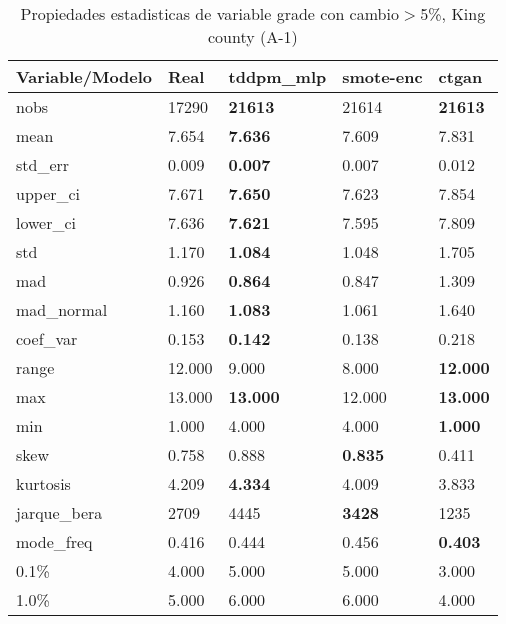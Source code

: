 \begin{table}[H]
\centering
\fontsize{8}{14}\selectfont
\caption{Propiedades estadisticas de variable grade con cambio\ensuremath{>}5\%, King county (A-1)}
\label{table-stats-king county-a-1-grade-short}
\begin{tabular}{|l|m{10em}|m{10em}|m{10em}|m{10em}|}
\hline
 \rowcolor[gray]{0.8}
Variable/Modelo & Real & tddpm\_mlp & smote-enc & ctgan \\
\hline nobs & 17290 & \bfseries 21613 & \cellcolor[rgb]{0.9, 0.54, 0.52} 21614 & \bfseries 21613 \\
\hline mean & 7.654 & \bfseries 7.636 & 7.609 & \cellcolor[rgb]{0.9, 0.54, 0.52} 7.831 \\
\hline std\_err & 0.009 & \bfseries 0.007 & 0.007 & \cellcolor[rgb]{0.9, 0.54, 0.52} 0.012 \\
\hline upper\_ci & 7.671 & \bfseries 7.650 & 7.623 & \cellcolor[rgb]{0.9, 0.54, 0.52} 7.854 \\
\hline lower\_ci & 7.636 & \bfseries 7.621 & 7.595 & \cellcolor[rgb]{0.9, 0.54, 0.52} 7.809 \\
\hline std & 1.170 & \bfseries 1.084 & 1.048 & \cellcolor[rgb]{0.9, 0.54, 0.52} 1.705 \\
\hline mad & 0.926 & \bfseries 0.864 & 0.847 & \cellcolor[rgb]{0.9, 0.54, 0.52} 1.309 \\
\hline mad\_normal & 1.160 & \bfseries 1.083 & 1.061 & \cellcolor[rgb]{0.9, 0.54, 0.52} 1.640 \\
\hline coef\_var & 0.153 & \bfseries 0.142 & 0.138 & \cellcolor[rgb]{0.9, 0.54, 0.52} 0.218 \\
\hline range & 12.000 & 9.000 & \cellcolor[rgb]{0.9, 0.54, 0.52} 8.000 & \bfseries 12.000 \\
\hline max & 13.000 & \bfseries 13.000 & \cellcolor[rgb]{0.9, 0.54, 0.52} 12.000 & \bfseries 13.000 \\
\hline min & 1.000 & \cellcolor[rgb]{0.9, 0.54, 0.52} 4.000 & \cellcolor[rgb]{0.9, 0.54, 0.52} 4.000 & \bfseries 1.000 \\
\hline skew & 0.758 & 0.888 & \bfseries 0.835 & \cellcolor[rgb]{0.9, 0.54, 0.52} 0.411 \\
\hline kurtosis & 4.209 & \bfseries 4.334 & 4.009 & \cellcolor[rgb]{0.9, 0.54, 0.52} 3.833 \\
\hline jarque\_bera & 2709 & \cellcolor[rgb]{0.9, 0.54, 0.52} 4445 & \bfseries 3428 & 1235 \\
\hline mode\_freq & 0.416 & 0.444 & \cellcolor[rgb]{0.9, 0.54, 0.52} 0.456 & \bfseries 0.403 \\
\hline 0.1\% & 4.000 & 5.000 & 5.000 & 3.000 \\
\hline 1.0\% & 5.000 & 6.000 & 6.000 & 4.000 \\
\hline
\end{tabular}
\end{table}

